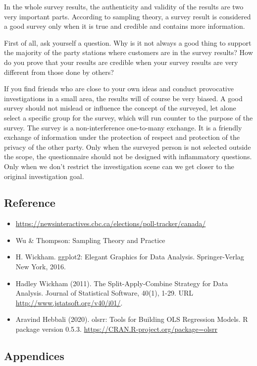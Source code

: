 \documentclass[
]{article}
\providecommand{\tightlist}{%
  \setlength{\itemsep}{0pt}\setlength{\parskip}{0pt}}
\begin{document}
In the whole survey results, the authenticity and validity of the
results are two very important parts. According to sampling theory, a
survey result is considered a good survey only when it is true and
credible and contains more information.

First of all, ask yourself a question. Why is it not always a good thing
to support the majority of the party stations where customers are in the
survey results? How do you prove that your results are credible when
your survey results are very different from those done by others?

If you find friends who are close to your own ideas and conduct
provocative investigations in a small area, the results will of course
be very biased. A good survey should not mislead or influence the
concept of the surveyed, let alone select a specific group for the
survey, which will run counter to the purpose of the survey. The survey
is a non-interference one-to-many exchange. It is a friendly exchange of
information under the protection of respect and protection of the
privacy of the other party. Only when the surveyed person is not
selected outside the scope, the questionnaire should not be designed
with inflammatory questions. Only when we don't restrict the
investigation scene can we get closer to the original investigation
goal.

\hypertarget{reference}{%
\subsection{Reference}\label{reference}}

\begin{itemize}
\tightlist
\item
  \url{https://newsinteractives.cbc.ca/elections/poll-tracker/canada/}
\item
  Wu \& Thompson: Sampling Theory and Practice
\item
  H. Wickham. ggplot2: Elegant Graphics for Data Analysis.
  Springer-Verlag New York, 2016.
\item
  Hadley Wickham (2011). The Split-Apply-Combine Strategy for Data
  Analysis. Journal of Statistical Software, 40(1), 1-29. URL
  \url{http://www.jstatsoft.org/v40/i01/}.
\item
  Aravind Hebbali (2020). olsrr: Tools for Building OLS Regression
  Models. R package version 0.5.3.
  \url{https://CRAN.R-project.org/package=olsrr}
\end{itemize}

\hypertarget{appendices}{%
\subsection{Appendices}\label{appendices}}
\end{document}
